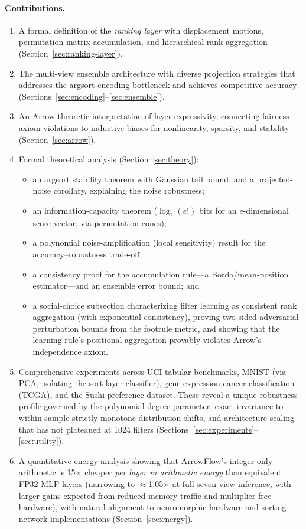 \documentclass[12pt]{article}
\begin{document}
\paragraph{Contributions.}
\begin{enumerate}[leftmargin=2em]
  \item A formal definition of the \emph{ranking layer} with displacement motions, permutation-matrix accumulation, and hierarchical rank aggregation (Section~\ref{sec:ranking-layer}).
  \item The multi-view ensemble architecture with diverse projection strategies that addresses the argsort encoding bottleneck and achieves competitive accuracy (Sections~\ref{sec:encoding}--\ref{sec:ensemble}).
  \item An Arrow-theoretic interpretation of layer expressivity, connecting fairness-axiom violations to inductive biases for nonlinearity, sparsity, and stability (Section~\ref{sec:arrow}).
  \item Formal theoretical analysis (Section~\ref{sec:theory}):
  \begin{itemize}[leftmargin=1.4em,topsep=2pt]
    \item an argsort stability theorem with Gaussian tail bound, and a projected-noise corollary, explaining the noise robustness;
    \item an information-capacity theorem ($\log_2(e!)$ bits for an $e$-dimensional score vector, via permutation cones);
    \item a polynomial noise-amplification (local sensitivity) result for the accuracy--robustness trade-off;
    \item a consistency proof for the accumulation rule---a Borda/mean-position estimator---and an ensemble error bound; and
    \item a social-choice subsection characterizing filter learning as consistent rank aggregation (with exponential consistency), proving two-sided adversarial-perturbation bounds from the footrule metric, and showing that the learning rule's positional aggregation provably violates Arrow's independence axiom.
  \end{itemize}
  \item Comprehensive experiments across UCI tabular benchmarks, MNIST (via PCA, isolating the sort-layer classifier), gene expression cancer classification (TCGA), and the Sushi preference dataset. These reveal a unique robustness profile governed by the polynomial degree parameter, exact invariance to within-sample strictly monotone distribution shifts, and architecture scaling that has not plateaued at 1024 filters (Sections~\ref{sec:experiments}--\ref{sec:utility}).
  \item A quantitative energy analysis showing that ArrowFlow's integer-only arithmetic is 15$\times$ cheaper \emph{per layer in arithmetic energy} than equivalent FP32 MLP layers (narrowing to $\approx$1.05$\times$ at full seven-view inference, with larger gains expected from reduced memory traffic and multiplier-free hardware), with natural alignment to neuromorphic hardware and sorting-network implementations (Section~\ref{sec:energy}).
\end{enumerate}
\end{document}
